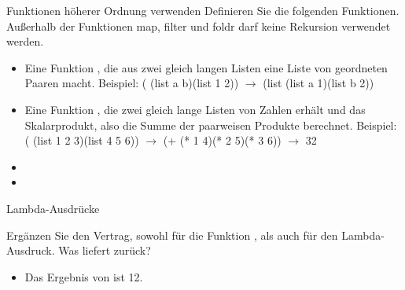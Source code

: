 \documentclass{../preamble}
\begin{document}
\begin{task}[credit = \stars{1}{3}]{Funktionen höherer Ordnung verwenden}
    Definieren Sie die folgenden Funktionen. Außerhalb der Funktionen \textcolor{keywordcolor}{map}, \textcolor{keywordcolor}{filter} und \textcolor{keywordcolor}{foldr} darf keine Rekursion verwendet werden.
    \begin{itemize}
        \item Eine Funktion , die aus zwei gleich langen Listen eine Liste von geordneten Paaren macht. Beispiel:
              \newline
              ( (\textcolor{keywordcolor}{list} \grqq a\grqq{} \grqq b\grqq)(\textcolor{keywordcolor}{list} 1 2)) \(\rightarrow\) (\textcolor{keywordcolor}{list} (\textcolor{keywordcolor}{list} \grqq a\grqq{} 1)(\textcolor{keywordcolor}{list} \grqq b\grqq{} 2))
        \item Eine Funktion , die zwei gleich lange Listen von Zahlen erhält und das Skalarprodukt, also die Summe der paarweisen Produkte berechnet. Beispiel:
              \newline
              ( (\textcolor{keywordcolor}{list} 1 2 3)(\textcolor{keywordcolor}{list} 4 5 6)) \(\rightarrow\) (+ (* 1 4)(* 2 5)(* 3 6)) \(\rightarrow\) 32
    \end{itemize}

    \begin{solution}
        \begin{itemize}
            \item {}
                  
            \item {}
                  
        \end{itemize}
    \end{solution}
\end{task}

\clearpage

\begin{task}[credit = \stars{1}{3}]{Lambda-Ausdrücke}
    
    Ergänzen Sie den Vertrag, sowohl für die Funktion , als auch für den Lambda-Ausdruck. Was liefert  zurück?

    \begin{solution}
        
    \end{solution}
    \begin{itemize}
        \item Das Ergebnis von  ist 12.
    \end{itemize}
\end{task}
\end{document}
